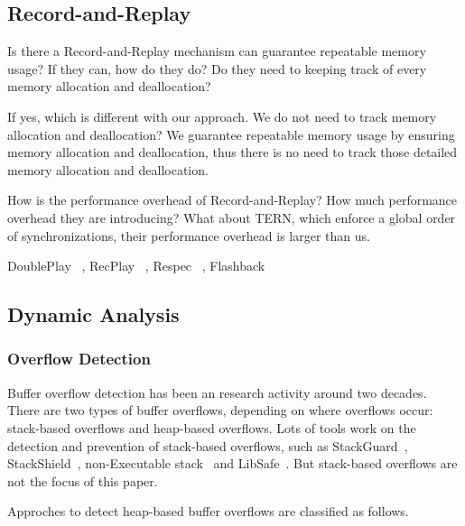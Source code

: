 
\subsection{Record-and-Replay}

Is there a Record-and-Replay mechanism can guarantee repeatable memory usage? If they can, how do they do?
Do they need to keeping track of every memory allocation and deallocation?

If yes, which is different with our approach. We do not need to track memory allocation and deallocation?
We guarantee repeatable memory usage by ensuring memory allocation and deallocation, thus 
there is no need to track those detailed memory allocation and deallocation. 

How is the performance overhead of Record-and-Replay? How much performance overhead they are introducing?
What about TERN, which enforce a global order of synchronizations, their performance overhead is larger
than us.

DoublePlay ~\cite{DoublePlay}, RecPlay ~\cite{RecPlay}, Respec ~\cite{Respec}, 
Flashback ~\cite{Flashback}

\subsection{Dynamic Analysis}
 
\subsubsection{Overflow Detection}
Buffer overflow detection has been an research activity around two decades. 
There are two types of buffer overflows, depending on where overflows occur:
stack-based overflows and heap-based overflows.
Lots of tools work on the detection and prevention of stack-based 
overflows, such as StackGuard~\cite{StackGuard}, StackShield~\cite{StackShield}, 
non-Executable stack~\cite{non-executablestack}
and LibSafe~\cite{Libsafe}. But stack-based overflows are not the focus of this paper. 

Approches to detect heap-based buffer overflows are classified as follows.  

